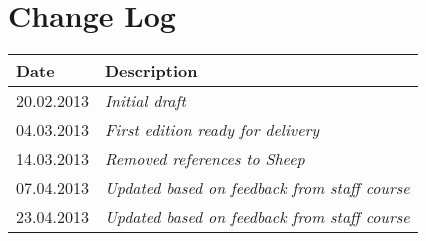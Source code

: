 \section{Change Log}
\label{sec:changelog}
\begin{tabular}{|l|l|}
\hline
Date & Description \\ \hline
20.02.2013 & \emph{Initial draft\/} \\ \hline
04.03.2013 & \emph{First edition ready for delivery\/} \\ \hline
14.03.2013 & \emph{Removed references to Sheep\/} \\ \hline
07.04.2013 & \emph{Updated based on feedback from staff course\/} \\ \hline
23.04.2013 & \emph{Updated based on feedback from staff course\/} \\ \hline
\end{tabular}
